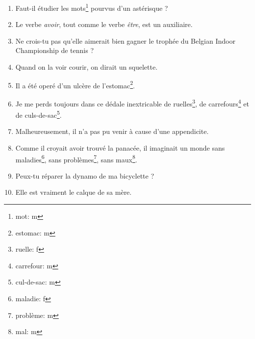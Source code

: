 \documentclass[11pt, french]{report}
\begin{document}
\begin{enumerate}
  \item Faut-il étudier les mots\footnote{mot: m} pourvus d'un astérisque ?
  \item Le verbe \textit{avoir}, tout comme le verbe \textit{être}, est un auxiliaire.
  \item Ne crois-tu pas qu'elle aimerait bien gagner le trophée du Belgian Indoor Championship de tennis ?
  \item Quand on la voir courir, on dirait un squelette.
  \item Il a été operé d'un ulcère de l'estomac\footnote{estomac: m}.
  \item Je me perds toujours dans ce dédale inextricable de ruelles\footnote{ruelle: f}, de carrefours\footnote{carrefour: m} et de culs-de-sac\footnote{cul-de-sac: m}.
  \item Malheureusement, il n'a pas pu venir à cause d'une appendicite.
  \item Comme il croyait avoir trouvé la panacée, il imaginait un monde sans maladies\footnote{maladie: f}, sans problèmes\footnote{problème: m}, sans maux\footnote{mal: m}.
  \item Peux-tu réparer la dynamo de ma bicyclette ?
  \item Elle est vraiment le calque de sa mère.
\end{enumerate}
\end{document}
